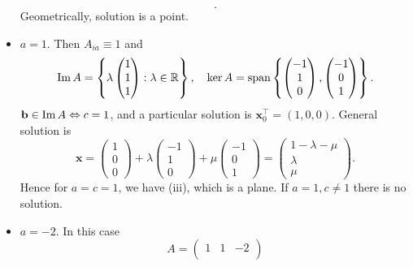 \documentclass[a4paper]{article}
\begin{document}
\begin{example}
\begin{itemize}
\[          .\]
          Geometrically, solution is a point.
        \item \underline{$a=1$}. Then $A_{ia}\equiv 1$ and
          \[
            \operatorname{Im} A=\left\{ \lambda
              \begin{pmatrix}
                1\\1\\1
            \end{pmatrix} : \lambda\in \mathbb{R} \right\},\quad \ker
            A = \operatorname{span}\left\{
              \begin{pmatrix}
                -1\\1\\0
              \end{pmatrix},
              \begin{pmatrix}
                -1\\0\\1
            \end{pmatrix} \right\}
          .\]
          $ \mathbf{b}\in \operatorname{Im} A \Leftrightarrow c=1 $, and a
          particular solution is $ \mathbf{x}_0^{\top}=(1,0,0) $.
          General solution is
          \[
            \mathbf{x}=
            \begin{pmatrix}
              1\\0\\0
            \end{pmatrix}+\lambda
            \begin{pmatrix}
              -1\\1\\0
            \end{pmatrix}+\mu
            \begin{pmatrix}
              -1\\0\\1
            \end{pmatrix}=
            \begin{pmatrix}
              1-\lambda-\mu\\
              \lambda\\
              \mu
            \end{pmatrix}
          .\]
          Hence for $a=c=1$, we have (iii), which is a plane. If
          $a=1,c\neq 1$ there is no solution.
        \item \underline{$a=-2$}. In this case
          \[
            A=
            \begin{pmatrix}
              1&1&-2\\

\end{pmatrix}\]
\end{itemize}
\end{example}
\end{document}
